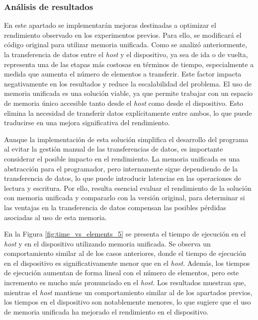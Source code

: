 \documentclass{article}
\begin{document}
		\subsubsection{Análisis de resultados}

			En este apartado se implementarán mejoras destinadas a optimizar el rendimiento observado en los experimentos previos. Para ello, se modificará el código original para utilizar memoria unificada. Como se analizó anteriormente, la transferencia de datos entre el \textit{host} y el dispositivo, ya sea de ida o de vuelta, representa una de las etapas más costosas en términos de tiempo, especialmente a medida que aumenta el número de elementos a transferir. Este factor impacta negativamente en los resultados y reduce la escalabilidad del problema. El uso de memoria unificada es una solución viable, ya que permite trabajar con un espacio de memoria único accesible tanto desde el \textit{host} como desde el dispositivo. Esto elimina la necesidad de transferir datos explícitamente entre ambos, lo que puede traducirse en una mejora significativa del rendimiento.

			Aunque la implementación de esta solución simplifica el desarrollo del programa al evitar la gestión manual de las transferencias de datos, es importante considerar el posible impacto en el rendimiento. La memoria unificada es una abstracción para el programador, pero internamente sigue dependiendo de la transferencia de datos, lo que puede introducir latencias en las operaciones de lectura y escritura. Por ello, resulta esencial evaluar el rendimiento de la solución con memoria unificada y compararlo con la versión original, para determinar si las ventajas en la transferencia de datos compensan las posibles pérdidas asociadas al uso de esta memoria.

			En la Figura \ref{fig:time_vs_elements_5} se presenta el tiempo de ejecución en el \textit{host} y en el dispositivo utilizando memoria unificada. Se observa un comportamiento similar al de los casos anteriores, donde el tiempo de ejecución en el dispositivo es significativamente menor que en el \textit{host}. Además, los tiempos de ejecución aumentan de forma lineal con el número de elementos, pero este incremento es mucho más pronunciado en el \textit{host}. Los resultados muestran que, mientras el \textit{host} mantiene un comportamiento similar al de los apartados previos, los tiempos en el dispositivo son notablemente menores, lo que sugiere que el uso de memoria unificada ha mejorado el rendimiento en el dispositivo.
\end{document}

